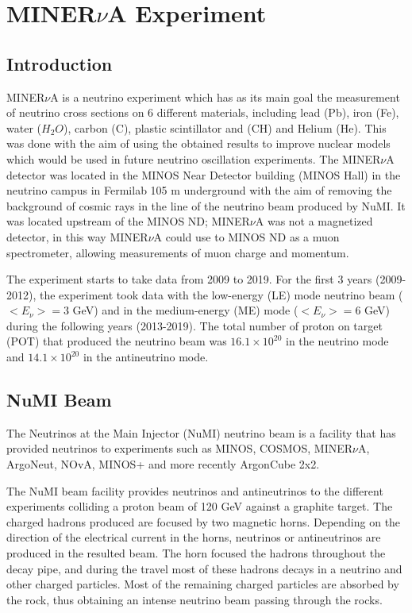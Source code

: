 \chapter{MINER$\nu$A Experiment}
\minitoc
\label{Cap:MnvExperiment}

\section{Introduction}
\label{Chap2:MnvExperiment:Intro}
MINER$\nu$A is a neutrino experiment which has as its main goal the measurement of neutrino cross sections on 6 different materials, including lead (Pb), iron (Fe), water ($H_2O$), carbon (C), plastic scintillator and (CH) and Helium (He). This was done with the aim of using the obtained results to improve nuclear models which would be used in future neutrino oscillation experiments. The MINER$\nu$A detector was located in the MINOS Near Detector building (MINOS Hall) in the neutrino campus in Fermilab 105 m underground with the aim of removing the background of cosmic rays in the line of the neutrino beam produced by NuMI. It was located upstream of the MINOS ND; MINER$\nu$A was not a magnetized detector, in this way MINER$\nu$A could use to MINOS ND as a muon spectrometer, allowing measurements of muon charge and momentum.  

The experiment starts to take data from 2009 to 2019. For the first 3 years (2009-2012), the experiment took data with the low-energy (LE) mode neutrino beam ($<E_\nu>=3$ GeV) and in the medium-energy (ME) mode ($<E_\nu> = 6$ GeV) during the following years (2013-2019). The total number of proton on target (POT) that produced the neutrino beam was $16.1\times10^{20}$ in the neutrino mode and $14.1\times10^{20}$ in the antineutrino mode. 

\section{NuMI Beam}
\label{Cap:MnvExperiment:NuMI}
The Neutrinos at the Main Injector \cite{Numi} (NuMI) neutrino beam is a facility that has provided neutrinos to experiments such as MINOS\cite{MINOS}, COSMOS\cite{COSMOS}, MINER$\nu$A\cite{MINERvA}, ArgoNeut\cite{ArgoNeuT}, NOvA\cite{NOvA}, MINOS+\cite{MINOS+} and more recently ArgonCube 2x2\cite{twobytwo}.

The NuMI beam facility provides neutrinos and antineutrinos to the different experiments colliding a proton beam of 120 GeV against a graphite target. The charged hadrons produced are focused by two magnetic horns. Depending on the direction of the electrical current in the horns, neutrinos or antineutrinos are produced in the resulted beam. The horn focused the hadrons throughout the decay pipe, and during the travel most of these hadrons decays in a neutrino and other charged particles. Most of the remaining charged particles are absorbed by the rock, thus obtaining an intense neutrino beam passing through the rocks.  

